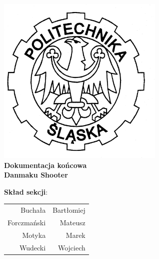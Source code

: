 \begin{titlepage}
	\centering
	\includegraphics[width=0.6\textwidth]{./images/logo.png}
	\\\vspace{10mm}
	\textbf{{\huge Dokumentacja końcowa}}\\\vspace{5mm}
	\textbf{{\Huge Danmaku Shooter}}
	\\
	\vfill
	\begin{flushright}
		{\Large \textbf{Skład sekcji}:}\\
		\begin{tabular}{rr}
			{\Large Buchała} & {\Large Bartłomiej}\\[-3pt]
			{\Large Forczmański} & {\Large Mateusz}\\[-3pt]
			{\Large Motyka} & {\Large Marek}\\[-3pt]
			{\Large Wudecki} & {\Large Wojciech}
		\end{tabular}
	\end{flushright}
	
\end{titlepage}